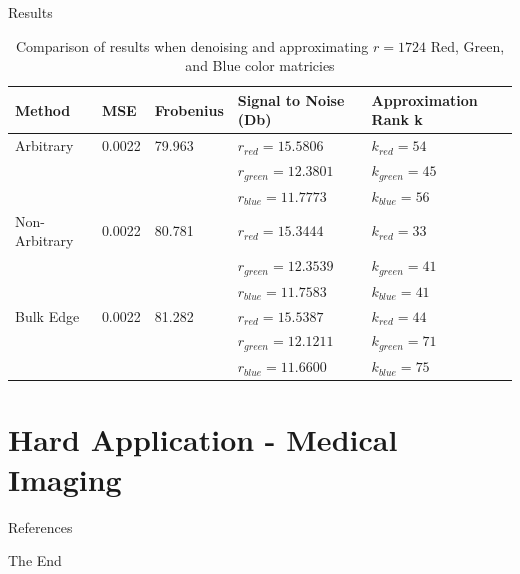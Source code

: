 \documentclass[aspectratio=169,xcolor=dvipsnames]{beamer}
\begin{document}
	\begin{frame}{Results}
		\begin{table}
			\begin{tabular}{l | l | l | l |l}
				\toprule
				\textbf{Method} & \textbf{MSE} & \textbf{Frobenius} & \textbf{Signal to Noise (Db)} & \textbf{Approximation Rank k} \\
				\midrule
				Arbitrary          & 0.0022           & 79.963 &  $r_{red} = 15.5806$ &  $k_{red} = 54$ \\
				& & & $r_{green} = 12.3801$ & $k_{green} = 45$ \\
				& & & $r_{blue} = 11.7773$ & $k_{blue} = 56$\\\hline
				Non-Arbitrary         & 0.0022            & 80.781 & $r_{red} = 15.3444$ & $k_{red} = 33$             \\
				& & & $r_{green} = 12.3539$ & $k_{green} = 41$\\
				& & & $r_{blue} = 11.7583$ & $k_{blue} = 41$\\\hline
				Bulk Edge       & 0.0022            & 81.282 & $r_{red} = 15.5387$ &      $k_{red} = 44$         \\
				& & & $r_{green} = 12.1211$ & $k_{green} = 71$\\
				& & & $r_{blue} = 11.6600$  & $k_{blue} = 75$\\
				\bottomrule
			\end{tabular}
			\caption{Comparison of results when denoising and approximating $r = 1724$ Red, Green, and Blue color matricies}
		\end{table}
	\end{frame}


	
	\section{Hard Application - Medical Imaging}
	
	\begin{frame}{References}
		\printbibliography
	\end{frame}
	
	
	\begin{frame}
		\Huge{\centerline{The End}}
	\end{frame}
	
	
\end{document}
